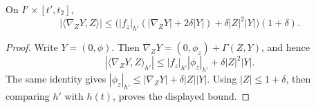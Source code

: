 \begin{theorem}
\label{lem:graph-flow-tangential-derivative}
\notready
On $I'\times[t',t_2]$,
\[
 |\langle\nabla_ZY,Z\rangle|
 \le\bigl(|f_z|_{h'}(|\nabla_ZY|+2\delta|Y|)
       +\delta|Z|^2|Y|\bigr)(1+\delta).
\]
\end{theorem}
\begin{proof}
Write $Y=(0,\phi)$.  Then
$\nabla_ZY=(0,\phi_z)+\Gamma(Z,Y)$, and hence
\[
 |\langle\nabla_ZY,Z\rangle_{h'}|
 \le |f_z|_{h'}|\phi_z|_{h'}+\delta|Z|^2|Y|.
\]
The same identity gives
$|\phi_z|_{h'}\le|\nabla_ZY|+\delta|Z||Y|$.  Using
$|Z|\le1+\delta$, then comparing $h'$ with $h(t)$, proves the displayed
bound.
\end{proof}

